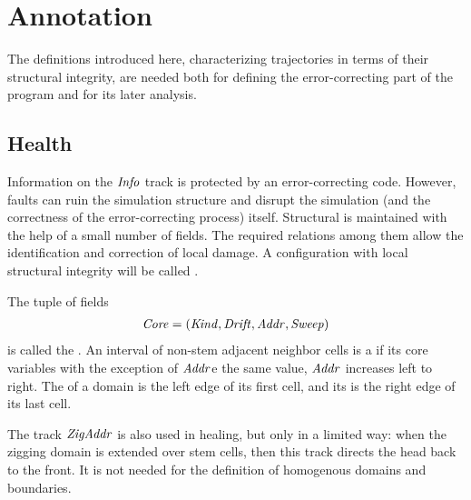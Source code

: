 \documentclass[11pt]{memoir}
\theoremstyle{definition} %
\renewcommand{\vek}[1]{\mathbf{#1}}
\newcommand{\fld}[1]{\ensuremath{\textit{#1\/}}}
\newcommand{\h}{h} %
\newcommand{\hc}{\hat h}
\newcommand{\vhc}{\vek{\hat h}}
\newcommand{\pos}{\mathrm{pos}}
\newcommand{\curcell}{\textrm{cur-cell}}
\newcommand{\Addr}{\fld{Addr}}
\newcommand{\Core}{\fld{Core}}
\newcommand{\Drift}{\fld{Drift}}
\newcommand{\Info}{\fld{Info}}
\newcommand{\Kind}{\fld{Kind}}
\newcommand{\Sweep}{\fld{Sweep}} %
\newcommand{\ZigAddr}{\fld{ZigAddr}}
\begin{document}
\section{Annotation}    \label{sec:annotation}

The definitions introduced here, characterizing trajectories in terms of their structural integrity,
are needed both for defining the error-correcting part of the
program and for its later analysis.

\subsection{Health}            \label{sec:health}

Information on the \( \Info \) track is protected by an error-correcting code.
However, faults can ruin the simulation structure and disrupt the simulation
(and the correctness of the error-correcting process) itself.
Structural is maintained with the help of a small number of fields.
The required relations among them 
allow the identification and correction of local damage.
A configuration with local structural integrity will be called .

\begin{definition}\label{def:domains}
The tuple of fields
\begin{align*}
   \Core =(\Kind,\Drift,\Addr,\Sweep)
 \end{align*}
is called the .   
 An interval of non-stem adjacent neighbor cells is a  if
 its core variables with the exception of \( \Addr \)e the same value,
 \( \Addr \) increases left to right.
The  of a domain is the left edge of its first cell, and its  is 
the right edge of its last cell.
\end{definition}

\begin{remark}
The track \( \ZigAddr \) is also used in healing, but only in a limited way: when the zigging domain
is extended over stem cells, then this track directs the head back to the front.
It is not needed for the definition of homogenous domains and boundaries.  
\end{remark}
\end{document}
